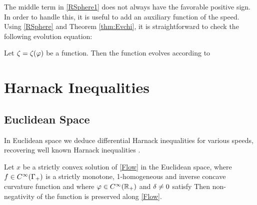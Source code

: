 \documentclass{amsart}
\begin{document}

The middle term in \cref{RSphere1} does not always have the favorable positive sign. In order to handle this, it is useful to add an auxiliary function of the speed. Using \cref{RSphere} and Theorem \ref{thm:Evchi}, it is straightforward to check the following evolution equation:

\begin{lemma}
Let $\zeta=\zeta(\varphi)$ be a function. Then the function
evolves according to
\end{lemma}

\section{Harnack Inequalities}

\subsection{Euclidean Space}

In Euclidean space we deduce differential Harnack inequalities for various speeds, recovering well known Harnack inequalities \cite{MR1296393, MR1100812, MR1316556, MR1480081, MR2813400}.

\begin{corollary}\label{EucHarnack}
Let $x$ be a strictly convex solution of \eqref{Flow} in the Euclidean space, where $f\in C^{\infty}(\Gamma_+)$ is a strictly monotone, 1-homogeneous and inverse concave curvature function and where $\varphi\in C^{\infty}(\mathbb{R}_+)$ and $\delta\neq 0$ satisfy
Then non-negativity of the function
is preserved along \eqref{Flow}.
\end{corollary}
\end{document}
